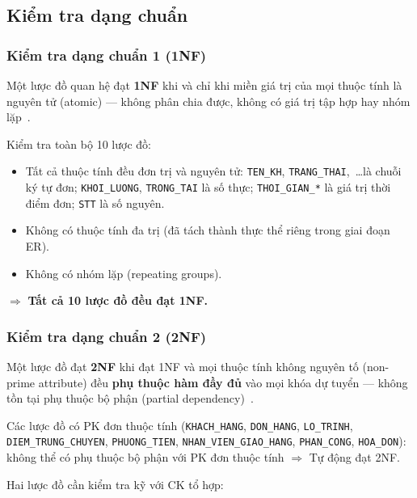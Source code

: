 \documentclass[11pt]{report}
\begin{document}
\subsection{Kiểm tra dạng chuẩn}
\label{subsec:kiemtra_dang_chuan}

\subsubsection{Kiểm tra dạng chuẩn 1 (1NF)}

Một lược đồ quan hệ đạt \textbf{1NF} khi và chỉ khi miền giá trị của mọi thuộc tính là nguyên tử (atomic) --- không phân chia được, không có giá trị tập hợp hay nhóm lặp~\cite{elmasri2015fundamentals}.

\noindent Kiểm tra toàn bộ 10 lược đồ:
\begin{itemize}
    \item Tất cả thuộc tính đều đơn trị và nguyên tử: \texttt{TEN\_KH}, \texttt{TRANG\_THAI},~\ldots là chuỗi ký tự đơn; \texttt{KHOI\_LUONG}, \texttt{TRONG\_TAI} là số thực; \texttt{THOI\_GIAN\_*} là giá trị thời điểm đơn; \texttt{STT} là số nguyên.
    
    \item Không có thuộc tính đa trị (đã tách thành thực thể riêng trong giai đoạn ER).
    
    \item Không có nhóm lặp (repeating groups).
\end{itemize}
$\Rightarrow$ \textbf{Tất cả 10 lược đồ đều đạt 1NF.}

\subsubsection{Kiểm tra dạng chuẩn 2 (2NF)}

Một lược đồ đạt \textbf{2NF} khi đạt 1NF và mọi thuộc tính không nguyên tố (non-prime attribute) đều \textbf{phụ thuộc hàm đầy đủ} vào mọi khóa dự tuyển --- không tồn tại phụ thuộc bộ phận (partial dependency)~\cite{elmasri2015fundamentals}.

Các lược đồ có PK đơn thuộc tính (\texttt{KHACH\_HANG}, \texttt{DON\_HANG}, \texttt{LO\_TRINH}, \texttt{DIEM\_TRUNG\_CHUYEN}, \texttt{PHUONG\_TIEN}, \texttt{NHAN\_VIEN\_GIAO\_HANG}, \texttt{PHAN\_CONG}, \texttt{HOA\_DON}): không thể có phụ thuộc bộ phận với PK đơn thuộc tính $\Rightarrow$ Tự động đạt 2NF.

Hai lược đồ cần kiểm tra kỹ với CK tổ hợp:
\end{document}
